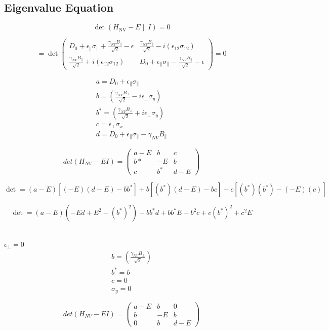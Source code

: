\subsection*{Eigenvalue Equation}


\begin{equation}
\det(H_{\text{NV}} - E\parallel{I}) = 0
\end{equation}

\[
= \det
\begin{pmatrix}
D_0 + \epsilon_{\parallel} \sigma_{\parallel} + \frac{\gamma_{NV} B_\parallel}{\sqrt{2}} - \epsilon & \frac{\gamma_{NV} B_\parallel}{\sqrt{2}} - i (\epsilon_{12} \sigma_{12}) \\
\frac{\gamma_{NV} B_\parallel}{\sqrt{2}} + i (\epsilon_{12} \sigma_{12}) & D_0 + \epsilon_{\parallel} \sigma_{\parallel} - \frac{\gamma_{NV} B_\parallel}{\sqrt{2}} - \epsilon
\end{pmatrix} = 0
\]

\begin{align*}
a = D_0 + \epsilon_{\parallel}  \sigma_{\parallel} \\
b = (\frac{\gamma_{NV} B_\bot}{\sqrt{2}} - {i}{\epsilon}_\bot\sigma_y) \\
b^* = (\frac{\gamma_{NV} B_\bot}{\sqrt{2}} + {i}{\epsilon}_\bot\sigma_y)\\
c =\epsilon_{\bot} \sigma_x \\
d = D_0 + \epsilon_{\parallel} \sigma_{\parallel} -\gamma_{NV} B_\parallel
\end{align*}

\[
det(H_{NV} - EI) = 
\begin{pmatrix}
 a-E& b & c \\
b* & -E & b \\
c & b^* & d-E
\end{pmatrix}
\]


\[
\det = (a-E)[(-E)(d-E) - bb^*] + b[(b^*)(d-E) - bc] + c[(b^*)(b^*)-(-E)(c)]
\]

\[
\det = (a-E)(-Ed+E^2-(b^*)^2) - bb^*d+bb^*E+b^2c+c(b^*)^2+c^2E
\]\

$\epsilon_\bot=0$
\begin{align*}
b = (\frac{\gamma_{NV} B_\bot}{\sqrt{2}}) \\
b^* = b\\
c = 0 \\
\sigma_y=0
\end{align*}

\[
det(H_{NV} - EI) = 
\begin{pmatrix}
 a-E& b & 0 \\
b & -E & b \\
0 & b & d-E
\end{pmatrix}
\]

